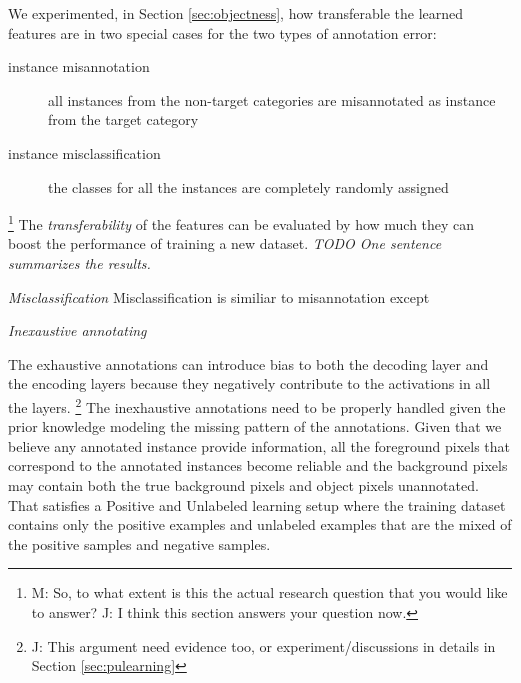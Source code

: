 We experimented, in Section \ref{sec:objectness}, how transferable the learned features are in two special cases for the two types of annotation error:
\begin{description}
  \item [instance misannotation] all instances from the non-target categories are misannotated as instance from the target category
  \item [instance misclassification] the classes for all the instances are completely randomly assigned
\end{description}
\footnote{M: So, to what extent is this the actual research question that you would like to answer? J: I think this section answers your question now.}
The \textit{transferability} of the features can be evaluated by how much they can boost the performance of training a new dataset. \cite{yosinski2014transferable}
\textit{TODO One sentence summarizes the results.}


\noindent
\textit{Misclassification}
Misclassification is similiar to misannotation except

\noindent
\textit{Inexaustive annotating}

\noindent
The exhaustive annotations can introduce bias to both the decoding layer and the encoding layers because they negatively contribute to the activations in all the layers.
\footnote{J: This argument need evidence too, or experiment/discussions in details in Section \ref{sec:pulearning}}
The inexhaustive annotations need to be properly handled given the prior knowledge modeling the missing pattern of the annotations.
Given that we believe any annotated instance provide information, all the foreground pixels that correspond to the annotated instances become reliable and the background pixels may contain both the true background pixels and object pixels unannotated.
That satisfies a Positive and Unlabeled learning setup where the training dataset contains only the positive examples and unlabeled examples that are the mixed of the positive samples and negative samples.
